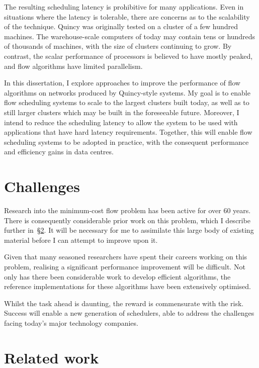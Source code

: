 The resulting scheduling latency is prohibitive for many applications. Even in situations where the latency is tolerable, there are concerns as to the scalability of the technique. Quincy was originally tested on a cluster of a few hundred machines. The warehouse-scale computers of today may contain tens or hundreds of thousands of machines, with the size of clusters continuing to grow. By contrast, the scalar performance of processors is believed to have mostly peaked, and flow algorithms have limited parallelism.

In this dissertation, I explore approaches to improve the performance of flow algorithms on networks produced by Quincy-style systems. My goal is to enable flow scheduling systems to scale to the largest clusters built today, as well as to still larger clusters which may be built in the foreseeable future. Moreover, I intend to reduce the scheduling latency to allow the system to be used with applications that have hard latency requirements. Together, this will enable flow scheduling systems to be adopted in practice, with the consequent performance and efficiency gains in data centres.

\section{Challenges} \label{sec:intro-challenges}
Research into the minimum-cost flow problem has been active for over 60 years. There is consequently considerable prior work on this problem, which I describe further in~\S\ref{sec:intro-related-work}. It will be necessary for me to assimilate this large body of existing material before I can attempt to improve upon it.

Given that many seasoned researchers have spent their careers working on this problem, realising a significant performance improvement will be difficult. Not only has there been considerable work to develop efficient algorithms, the reference implementations for these algorithms have been extensively optimised.

Whilst the task ahead is daunting, the reward is commensurate with the risk. Success will enable a new generation of schedulers, able to address the challenges facing today's major technology companies.

\section{Related work} \label{sec:intro-related-work}

